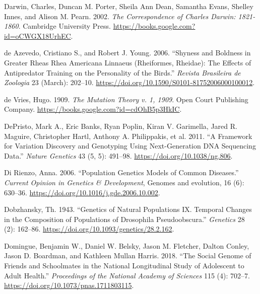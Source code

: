 \documentclass[
]{book}
\newlength{\cslhangindent}
\newlength{\cslentryspacingunit} %
\newenvironment{CSLReferences}[2] %
 {%
  \setlength{\parindent}{0pt}
  \ifodd #1
  \let\oldpar\par
  \def\par{\hangindent=\cslhangindent\oldpar}
  \fi
  \setlength{\parskip}{#2\cslentryspacingunit}
 }%
 {}
\begin{document}
\begin{CSLReferences}{1}{0}
\leavevmode{}%
Darwin, Charles, Duncan M. Porter, Sheila Ann Dean, Samantha Evans, Shelley Innes, and Alison M. Pearn. 2002. \emph{The {Correspondence} of {Charles Darwin}: 1821-1860}. {Cambridge University Press}. \url{https://books.google.com?id=oCWGX18UrhEC}.

\leavevmode{}%
de Azevedo, Cristiano S., and Robert J. Young. 2006. {``Shyness and Boldness in Greater Rheas {Rhea} Americana {Linnaeus} ({Rheiformes}, {Rheidae}): The Effects of Antipredator Training on the Personality of the Birds.''} \emph{Revista Brasileira de Zoologia} 23 (March): 202--10. \url{https://doi.org/10.1590/S0101-81752006000100012}.

\leavevmode{}%
de Vries, Hugo. 1909. \emph{The {Mutation} Theory v. 1, 1909}. {Open Court Publishing Company}. \url{https://books.google.com?id=cdOhB5p3HkIC}.

\leavevmode{}%
DePristo, Mark A., Eric Banks, Ryan Poplin, Kiran V. Garimella, Jared R. Maguire, Christopher Hartl, Anthony A. Philippakis, et al. 2011. {``A Framework for Variation Discovery and Genotyping Using Next-Generation {DNA} Sequencing Data.''} \emph{Nature Genetics} 43 (5, 5): 491--98. \url{https://doi.org/10.1038/ng.806}.

\leavevmode{}%
Di Rienzo, Anna. 2006. {``Population Genetics Models of Common Diseases.''} \emph{Current Opinion in Genetics \& Development}, Genomes and evolution, 16 (6): 630--36. \url{https://doi.org/10.1016/j.gde.2006.10.002}.

\leavevmode{}%
Dobzhansky, Th. 1943. {``Genetics of Natural Populations {IX}. {Temporal} Changes in the Composition of Populations of Drosophila Pseudoobscura.''} \emph{Genetics} 28 (2): 162--86. \url{https://doi.org/10.1093/genetics/28.2.162}.

\leavevmode{}%
Domingue, Benjamin W., Daniel W. Belsky, Jason M. Fletcher, Dalton Conley, Jason D. Boardman, and Kathleen Mullan Harris. 2018. {``The Social Genome of Friends and Schoolmates in the {National Longitudinal Study} of {Adolescent} to {Adult Health}.''} \emph{Proceedings of the National Academy of Sciences} 115 (4): 702--7. \url{https://doi.org/10.1073/pnas.1711803115}.


\end{CSLReferences}
\end{document}
